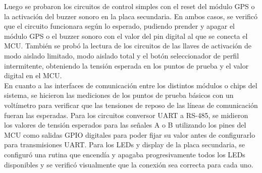 Luego se probaron los circuitos de control simples con el reset del módulo GPS o la activación del buzzer sonoro en la placa secundaria. En ambos casos, se verificó que el circuito funcionara según lo esperado, pudiendo prender y apagar el módulo GPS o el buzzer sonoro con el valor del pin digital al que se conecta el MCU. También se probó la lectura de los circuitos de las llaves de activación de modo aislado limitado, modo aislado total y el botón seleccionador de perfil intermitente, obteniendo la tensión esperada en los puntos de prueba y el valor digital en el MCU. \\ 

En cuanto a las interfaces de comunicación entre los distintos módulos o chips del sistema, se hicieron las mediciones de los puntos de prueba básicos con un voltímetro para verificar que las tensiones de reposo de las líneas de comunicación fueran las esperadas. Para los circuitos conversor UART a RS-485, se midieron los valores de tensión esperados para las señales A o B utilizando los pines del MCU como salidas GPIO digitales para poder fijar su valor antes de configurarlo para transmisiones UART. Para los LEDs y display de la placa secundaria, se configuró una rutina que encendía y apagaba progresivamente todos los LEDs disponibles y se verificó visualmente que la conexión sea correcta para cada uno.  







